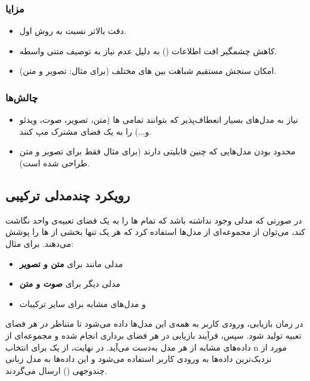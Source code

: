 \documentclass{article}
\begin{document}
\subsubsection{مزایا}
\begin{itemize}
\item دقت بالاتر نسبت به روش اول.
\item کاهش چشمگیر افت اطلاعات () به دلیل عدم نیاز به توصیف متنی واسطه.

\item امکان سنجش مستقیم شباهت بین های مختلف (برای مثال: تصویر و متن).

\end{itemize}

\subsubsection{چالش‌ها}
\begin{itemize}
\item نیاز به مدل‌های بسیار انعطاف‌پذیر که بتوانند تمامی ها (متن، تصویر، صوت، ویدئو و...) را به یک فضای مشترک مپ کنند.

\item محدود بودن مدل‌هایی که چنین قابلیتی دارند (برای مثال  فقط برای تصویر و متن طراحی شده است).
\end{itemize}

\subsection{رویکرد چندمدلی ترکیبی }

در صورتی که مدلی وجود نداشته باشد که تمام ها را به یک فضای تعبیه‌ی واحد نگاشت کند، می‌توان از مجموعه‌ای از مدل‌ها استفاده کرد که هر یک تنها بخشی از ها را پوشش می‌دهند.
برای مثال:
\begin{itemize}
\item مدلی مانند  برای \textbf{متن و تصویر}
\item مدلی دیگر برای \textbf{صوت و متن}
\item و مدل‌های مشابه برای سایر ترکیبات
\end{itemize}

در زمان بازیابی، ورودی کاربر به همه‌ی این مدل‌ها داده می‌شود تا  متناظر در هر فضای تعبیه تولید شود.
سپس، فرآیند بازیابی در هر فضای برداری انجام شده و مجموعه‌ای از داده‌های مشابه از هر مدل به‌دست می‌آید.
در نهایت، از یک  برای انتخاب n مورد از نزدیک‌ترین داده‌ها به ورودی کاربر استفاده می‌شود و این داده‌ها به مدل زبانی چندوجهی () ارسال می‌گردند.
\end{document}
